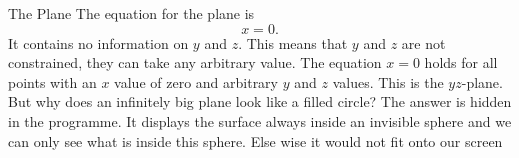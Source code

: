 \begin{surferPage}{The Plane}
The equation for the plane is \[x=0.\] It contains no information on $y$ and $z$. This means that $y$ and $z$ are not constrained, they can take any arbitrary value.
The equation $x=0$ holds for all points with an $x$ value of zero and arbitrary $y$ and $z$ values. This is the $yz$-plane.
\newline \newline
But why does an infinitely big plane look like a filled circle? The answer is hidden in the programme. It displays the surface always inside an invisible sphere and we can only see what is inside this sphere. Else wise it would not fit onto our screen
\end{surferPage}
